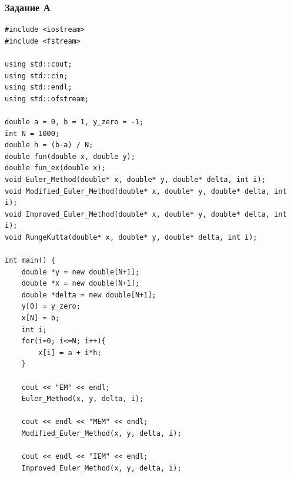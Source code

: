 \documentclass[
11pt,
master, %
subf, %
href, %
colorlinks=true, %
times, %
]{disser}
\begin{document}
\subsubsection{Задание А}
{\footnotesize
\begin{verbatim}
#include <iostream>
#include <fstream>

using std::cout;
using std::cin;
using std::endl;
using std::ofstream;

double a = 0, b = 1, y_zero = -1;
int N = 1000;
double h = (b-a) / N;
double fun(double x, double y);
double fun_ex(double x);
void Euler_Method(double* x, double* y, double* delta, int i);
void Modified_Euler_Method(double* x, double* y, double* delta, int i);
void Improved_Euler_Method(double* x, double* y, double* delta, int i);
void RungeKutta(double* x, double* y, double* delta, int i);

int main() {
    double *y = new double[N+1];
    double *x = new double[N+1];
    double *delta = new double[N+1];
    y[0] = y_zero;
    x[N] = b;
    int i;
    for(i=0; i<=N; i++){
        x[i] = a + i*h;
    }

    cout << "EM" << endl;
    Euler_Method(x, y, delta, i);

    cout << endl << "MEM" << endl;
    Modified_Euler_Method(x, y, delta, i);

    cout << endl << "IEM" << endl;
    Improved_Euler_Method(x, y, delta, i);


\end{verbatim}}
\end{document}
